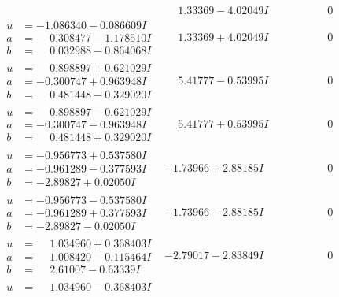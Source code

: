 \documentclass[1p]{elsarticle_modified}
\theoremstyle{definition}
\begin{document}
$$\begin{array}{c|c|c}
 & \phantom{-}1.33369 - 4.02049 I & \phantom{-0.000000 } 0 \\ \hline\begin{aligned}
u &= -1.086340 - 0.086609 I \\
a &= \phantom{-}0.308477 - 1.178510 I \\
b &= \phantom{-}0.032988 - 0.864068 I\end{aligned}
 & \phantom{-}1.33369 + 4.02049 I & \phantom{-0.000000 } 0 \\ \hline\begin{aligned}
u &= \phantom{-}0.898897 + 0.621029 I \\
a &= -0.300747 + 0.963948 I \\
b &= \phantom{-}0.481448 - 0.329020 I\end{aligned}
 & \phantom{-}5.41777 - 0.53995 I & \phantom{-0.000000 } 0 \\ \hline\begin{aligned}
u &= \phantom{-}0.898897 - 0.621029 I \\
a &= -0.300747 - 0.963948 I \\
b &= \phantom{-}0.481448 + 0.329020 I\end{aligned}
 & \phantom{-}5.41777 + 0.53995 I & \phantom{-0.000000 } 0 \\ \hline\begin{aligned}
u &= -0.956773 + 0.537580 I \\
a &= -0.961289 - 0.377593 I \\
b &= -2.89827 + 0.02050 I\end{aligned}
 & -1.73966 + 2.88185 I & \phantom{-0.000000 } 0 \\ \hline\begin{aligned}
u &= -0.956773 - 0.537580 I \\
a &= -0.961289 + 0.377593 I \\
b &= -2.89827 - 0.02050 I\end{aligned}
 & -1.73966 - 2.88185 I & \phantom{-0.000000 } 0 \\ \hline\begin{aligned}
u &= \phantom{-}1.034960 + 0.368403 I \\
a &= \phantom{-}1.008420 - 0.115464 I \\
b &= \phantom{-}2.61007 - 0.63339 I\end{aligned}
 & -2.79017 - 2.83849 I & \phantom{-0.000000 } 0 \\ \hline\begin{aligned}
u &= \phantom{-}1.034960 - 0.368403 I \\

\end{aligned}
\end{array}$$
\end{document}
